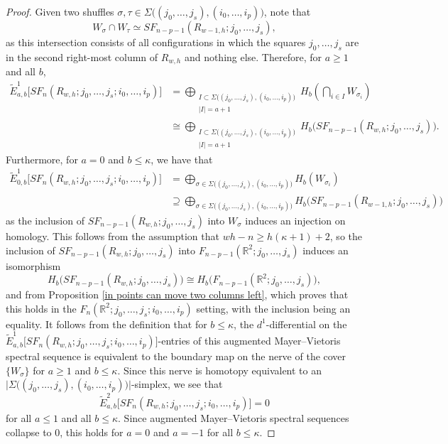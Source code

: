\documentclass[pagebackref,colorlinks,citecolor=blue,linkcolor=blue,urlcolor=blue,filecolor=blue]{article}
\theoremstyle{definition}\newtheorem{definition}[thm]{Definition}
\theoremstyle{definition}
\newcommand{\R}{\ensuremath{\mathbb{R}}}
\begin{document}
\begin{proof}
Given two shuffles $\sigma, \tau\in \Sigma\big((j_{0},\dots, j_{s}), (i_{0},\dots, i_{p})\big)$, note that
\[
W_{\sigma}\cap W_{\tau}\simeq SF_{n-p-1}(R_{w-1, h}; j_{0}, \dots, j_{s}),
\]
as this intersection consists of all configurations in which the squares $j_{0},\dots, j_{s}$ are in the second right-most column of $R_{w,h}$ and nothing else.
Therefore, for $a\ge 1$ and all $b$,
\begin{align*}
\tilde{E}^{1}_{a,b}\big[SF_{n}(R_{w, h};j_{0}, \dots, j_{s};i_{0},\dots, i_{p})\big]&=\bigoplus_{\substack{I\subset \Sigma\big((j_{0},\dots, j_{s}), (i_{0},\dots, i_{p})\big)\\|I|=a+1}}H_{b}\left(\bigcap_{i\in I}W_{\sigma_{i}}\right)\\
&\cong\bigoplus_{\substack{I\subset \Sigma\big((j_{0},\dots, j_{s}), (i_{0},\dots, i_{p})\big)\\|I|=a+1}} H_{b}\big(SF_{n-p-1}(R_{w, h};j_{0},\dots, j_{s})\big).
\end{align*}
Furthermore, for $a=0$ and $b\le \kappa$, we have that
\begin{align*}
\tilde{E}^{1}_{0,b}\big[SF_{n}(R_{w, h};j_{0}, \dots, j_{s};i_{0},\dots, i_{p})\big]&=\bigoplus_{\sigma\in\Sigma\big((j_{0},\dots, j_{s}), (i_{0},\dots, i_{p})\big)}H_{b}(W_{\sigma_{i}})\\
&\supseteq\bigoplus_{\sigma\in\Sigma\big((j_{0},\dots, j_{s}), (i_{0},\dots, i_{p})\big)}H_{b}\big(SF_{n-p-1}(R_{w-1,h};j_{0}, \dots, j_{s})\big)
\end{align*}
as the inclusion of $SF_{n-p-1}(R_{w, h}; j_{0},\dots, j_{s})$ into $W_{\sigma}$ induces an injection on homology.
This follows from the assumption that $wh-n\ge h(\kappa+1)+2$, so the inclusion of $SF_{n-p-1}(R_{w,h};j_{0}, \dots, j_{s})$ into $F_{n-p-1}(\R^{2};j_{0}, \dots, j_{s})$ induces an isomorphism
\[
H_{b}\big(SF_{n-p-1}(R_{w,h};j_{0}, \dots, j_{s})\big)\cong H_{b}\big(F_{n-p-1}(\R^{2};j_{0}, \dots, j_{s})\big),
\]
and from Proposition \ref{in points can move two columns left}, which proves that this holds in the $F_{n}(\R^{2}; j_{0}, \dots, j_{s}; i_{0},\dots, i_{p})$ setting, with the inclusion being an equality.
It follows from the definition that for $b\le \kappa$, the $d^{1}$-differential on the $\tilde{E}^{1}_{a,b}\big[SF_{n}(R_{w, h};j_{0}, \dots, j_{s};i_{0},\dots, i_{p})\big]$-entries of this augmented Mayer--Vietoris spectral sequence is equivalent to the boundary map on the nerve of the cover $\{W_{\sigma}\}$ for $a\ge 1$ and $b\le \kappa$.
Since this nerve is homotopy equivalent to an $\big|\Sigma\big((j_{0},\dots, j_{s}), (i_{0},\dots, i_{p})\big)\big|$-simplex, we see that 
\[
\tilde{E}^{2}_{a,b}\big[SF_{n}(R_{w, h};j_{0}, \dots, j_{s};i_{0},\dots, i_{p})\big]=0
\]
for all $a\le 1$ and all $b\le \kappa$.
Since augmented Mayer--Vietoris spectral sequences collapse to $0$, this holds for $a=0$ and $a=-1$ for all $b\le \kappa$.



\end{proof}
\end{document}
